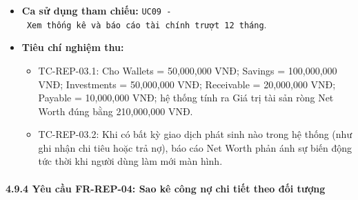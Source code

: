 \documentclass[11pt,a4paper]{article}
\providecommand{\tightlist}{
  \setlength{\itemsep}{0pt}\setlength{\parskip}{0pt}}
\begin{document}
\begin{itemize}
  \begin{itemize}
  \tightlist
  \item
    Bảng tổng hợp tài sản gồm 5 dòng: Wallets, Savings, Investments,
    Receivable, Payable.
  \item
    Giá trị Net Worth cuối cùng và tỷ trọng phần trăm của từng cấu phần.
  \end{itemize}
\item
  \textbf{Ca sử dụng tham chiếu:}
  \texttt{UC09\ -\ Xem\ thống\ kê\ và\ báo\ cáo\ tài\ chính\ trượt\ 12\ tháng}.
\item
  \textbf{Tiêu chí nghiệm thu:}

  \begin{itemize}
  \tightlist
  \item
    TC-REP-03.1: Cho Wallets = 50,000,000 VNĐ; Savings = 100,000,000
    VNĐ; Investments = 50,000,000 VNĐ; Receivable = 20,000,000 VNĐ;
    Payable = 10,000,000 VNĐ; hệ thống tính ra Giá trị tài sản ròng Net
    Worth đúng bằng 210,000,000 VNĐ.
  \item
    TC-REP-03.2: Khi có bất kỳ giao dịch phát sinh nào trong hệ thống
    (như ghi nhận chi tiêu hoặc trả nợ), báo cáo Net Worth phản ánh sự
    biến động tức thời khi người dùng làm mới màn hình.
  \end{itemize}
\end{itemize}

\paragraph{4.9.4 Yêu cầu FR-REP-04: Sao kê công nợ chi tiết theo đối
tượng}\label{494-yuxeau-cux1ea7u-fr-rep-04-sao-kuxea-cuxf4ng-nux1ee3-chi-tiux1ebft-theo-ux111ux1ed1i-tux1b0ux1ee3ng}
\end{document}
